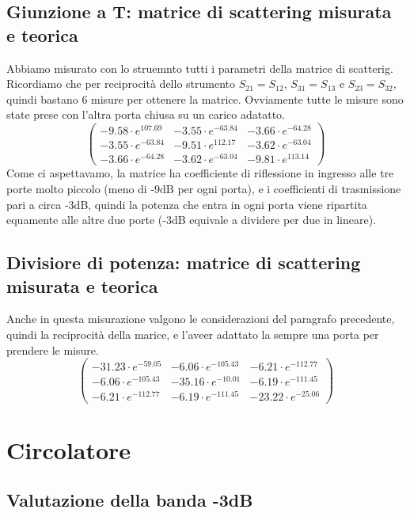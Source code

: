 \documentclass[11pt,a4paper,oneside]{book}
\begin{document}
\section{Giunzione a T: matrice di scattering misurata e teorica}
Abbiamo misurato con lo struemnto tutti i parametri della matrice di scatterig. Ricordiamo che per reciprocità dello strumento $S_{21}=S_{12}$, $S_{31}=S_{13}$ e $S_{23}=S_{32}$, quindi bastano 6 misure per ottenere la matrice. Ovviamente tutte le misure sono state prese con l'altra porta chiusa su un carico adatatto.
\[
\begin{pmatrix}
-9.58 \cdot e^{107.69} & -3.55 \cdot e^{-63.84} & -3.66 \cdot e^{-64.28} \\
-3.55 \cdot e^{-63.84} & -9.51\cdot e^{112.17} & -3.62\cdot e^{-63.04} \\
-3.66 \cdot e^{-64.28} & -3.62 \cdot e^{-63.04} & -9.81 \cdot e^{113.14}
\end{pmatrix}
\]
Come ci aspettavamo, la matrice ha coefficiente di riflessione in ingresso alle tre porte molto piccolo (meno di -9dB per ogni porta), e i coefficienti di trasmissione pari a circa -3dB, quindi 
la potenza che entra in ogni porta viene ripartita equamente alle altre due porte (-3dB equivale a dividere per due in lineare).

\section{Divisiore di potenza: matrice di scattering misurata e teorica}
Anche in questa misurazione valgono le considerazioni del paragrafo precedente, quindi la reciprocità della marice, e l'aveer adattato la sempre una porta per prendere le misure.
\[
\begin{pmatrix}
 -31.23 \cdot e^{-59.05} & -6.06 \cdot e^{-105.43} & -6.21 \cdot e^{-112.77} \\
-6.06 \cdot e^{-105.43} & -35.16\cdot e^{-10.01} & -6.19\cdot e^{-111.45} \\
-6.21 \cdot e^{-112.77} & -6.19\cdot e^{-111.45} & -23.22 \cdot e^{-25.06}
\end{pmatrix}
\]

\chapter{Circolatore}

\section{Valutazione della banda -3dB}
\end{document}
